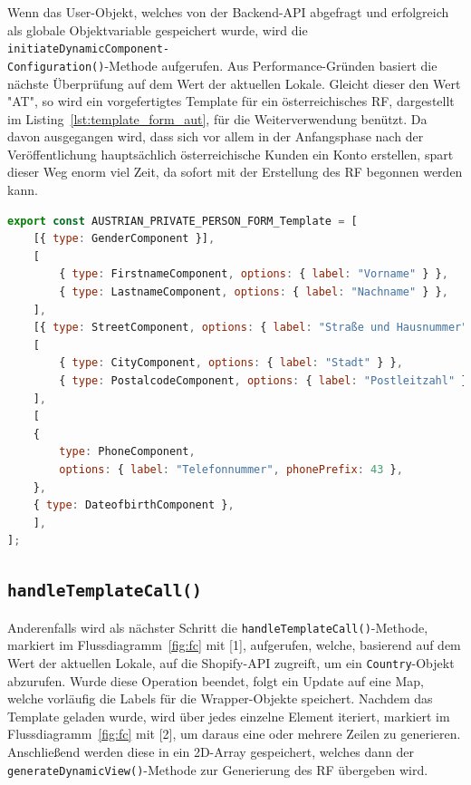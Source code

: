 Wenn das User-Objekt, welches von der Backend-API abgefragt und erfolgreich als globale Objektvariable gespeichert wurde, wird die \texttt{initiateDynamicComponent-\\Configuration()}-Methode aufgerufen. Aus Performance-Gründen basiert die nächste Überprüfung auf dem Wert der aktuellen Lokale. Gleicht dieser den Wert "AT", so wird ein vorgefertigtes Template für ein österreichisches RF, dargestellt im Listing~\ref{lst:template_form_aut}, für die Weiterverwendung benützt. Da davon ausgegangen wird, dass sich vor allem in der Anfangsphase nach der Veröffentlichung hauptsächlich österreichische Kunden ein Konto erstellen, spart dieser Weg enorm viel Zeit, da sofort mit der Erstellung des RF begonnen werden kann.

\begin{lstlisting}[caption={Vordefiniertes Template für das RF}, language=JavaScript,label={lst:template_form_aut}]
export const AUSTRIAN_PRIVATE_PERSON_FORM_Template = [
	[{ type: GenderComponent }],
	[
		{ type: FirstnameComponent, options: { label: "Vorname" } },
		{ type: LastnameComponent, options: { label: "Nachname" } },
	],
	[{ type: StreetComponent, options: { label: "Straße und Hausnummer" } }],
	[
		{ type: CityComponent, options: { label: "Stadt" } },
		{ type: PostalcodeComponent, options: { label: "Postleitzahl" } },
	],
	[
	{
		type: PhoneComponent,
		options: { label: "Telefonnummer", phonePrefix: 43 },
	},
	{ type: DateofbirthComponent },
	],
];
\end{lstlisting}

\subsection{\texttt{handleTemplateCall()}}

Anderenfalls wird als nächster Schritt die \texttt{handleTemplateCall()}-Methode, markiert im Flussdiagramm~\ref{fig:fc} mit [1], aufgerufen, welche, basierend auf dem Wert der aktuellen Lokale, auf die Shopify-API zugreift, um ein \texttt{Country}-Objekt abzurufen. Wurde diese Operation beendet, folgt ein Update auf eine Map, welche vorläufig die Labels für die Wrapper-Objekte speichert. Nachdem das Template geladen wurde, wird über jedes einzelne Element iteriert, markiert im Flussdiagramm~\ref{fig:fc} mit [2], um daraus eine oder mehrere Zeilen zu generieren. Anschließend werden diese in ein 2D-Array gespeichert, welches dann der \texttt{generateDynamicView()}-Methode zur Generierung des RF übergeben wird.

